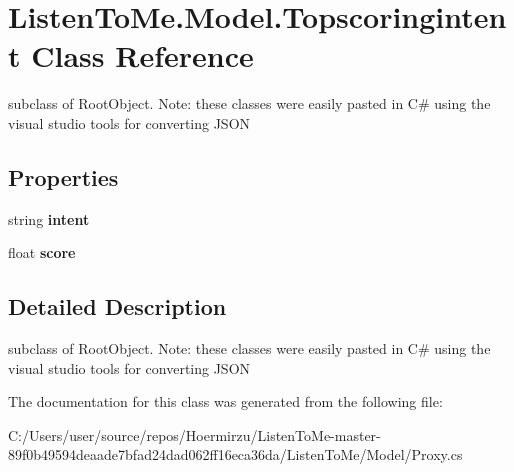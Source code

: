 \hypertarget{class_listen_to_me_1_1_model_1_1_topscoringintent}{}\section{Listen\+To\+Me.\+Model.\+Topscoringintent Class Reference}
\label{class_listen_to_me_1_1_model_1_1_topscoringintent}


subclass of Root\+Object. Note\+: these classes were easily pasted in C\# using the visual studio tools for converting J\+S\+ON  


\subsection*{Properties}
\begin{DoxyCompactItemize}
\item 
string {\bfseries intent}\hypertarget{class_listen_to_me_1_1_model_1_1_topscoringintent_a3124e191e99297ef94e0d5d5c4eac40e}{}\label{class_listen_to_me_1_1_model_1_1_topscoringintent_a3124e191e99297ef94e0d5d5c4eac40e}

\item 
float {\bfseries score}\hypertarget{class_listen_to_me_1_1_model_1_1_topscoringintent_abf874e7fa0861cde6292c84eca9dc18b}{}\label{class_listen_to_me_1_1_model_1_1_topscoringintent_abf874e7fa0861cde6292c84eca9dc18b}

\end{DoxyCompactItemize}


\subsection{Detailed Description}
subclass of Root\+Object. Note\+: these classes were easily pasted in C\# using the visual studio tools for converting J\+S\+ON 



The documentation for this class was generated from the following file\+:\begin{DoxyCompactItemize}
\item 
C\+:/\+Users/user/source/repos/\+Hoermirzu/\+Listen\+To\+Me-\/master-\/89f0b49594deaade7bfad24dad062ff16eca36da/\+Listen\+To\+Me/\+Model/Proxy.\+cs\end{DoxyCompactItemize}
